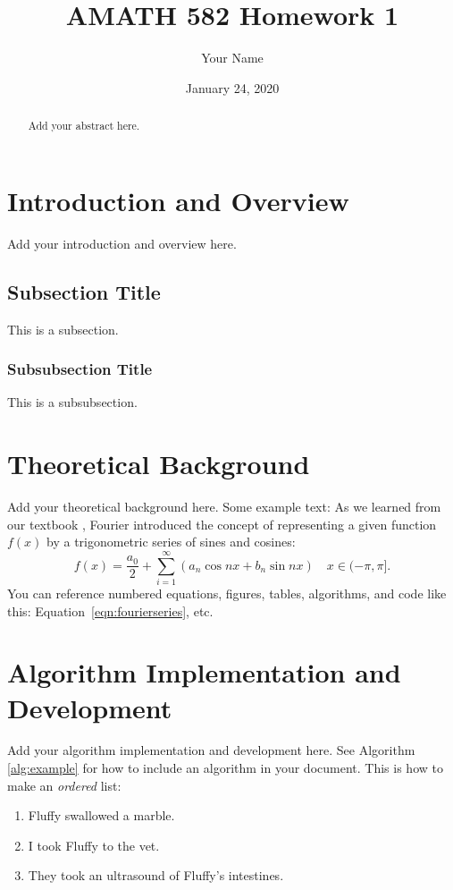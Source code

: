 \documentclass{article}
\title{AMATH 582 Homework 1}
\author{Your Name}
\date{January 24, 2020}
\begin{document}
\maketitle

\begin{abstract}
    Add your abstract here.
\end{abstract}

\section{Introduction and Overview}
Add your introduction and overview here.

\subsection{Subsection Title}
This is a subsection.

\subsubsection{Subsubsection Title}
This is a subsubsection.

\section{Theoretical Background}
Add your theoretical background here. Some example text: As we learned from our
textbook \cite{kutz_2013}, Fourier introduced the concept of representing a
given function $f(x)$ by a trigonometric series of sines and cosines:
\begin{equation}
    f(x) = \frac{a_0}{2} + \sum_{i=1}^\infty \left(a_n\cos{nx} + b_n\sin{nx}
    \right) \quad x \in (-\pi,\pi].
    \label{eqn:fourierseries}
\end{equation}
You can reference numbered equations, figures, tables, algorithms, and code like
this: Equation~\ref{eqn:fourierseries}, etc.

\section{Algorithm Implementation and Development}
Add your algorithm implementation and development here. See Algorithm~
\ref{alg:example} for how to include an algorithm in your document. This is how
to make an \textit{ordered} list:
\begin{enumerate}
    \item Fluffy swallowed a marble.
    \item I took Fluffy to the vet.
    \item They took an ultrasound of Fluffy's intestines.
\end{enumerate}
\end{document}
